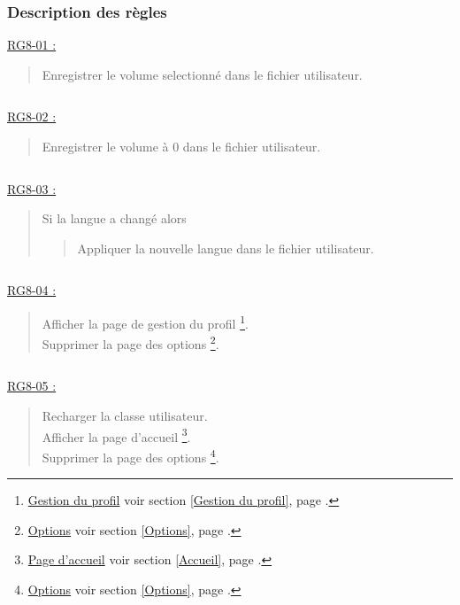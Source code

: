 \documentclass{report}
\begin{document}
		\subsubsection{Description des règles}

			\underline{RG8-01 :}
				\begin{quote}
					Enregistrer le volume selectionné dans le fichier utilisateur.
				\end{quote}

			$\,$	

			\underline{RG8-02 :}
				\begin{quote}
					Enregistrer le volume à 0 dans le fichier utilisateur.
				\end{quote}

			$\,$		

			\underline{RG8-03 :}
				\begin{quote}
					Si la langue a changé alors
					\begin{quote}
						Appliquer la nouvelle langue dans le fichier utilisateur.
					\end{quote}
				\end{quote}

			$\,$

			\underline{RG8-04 :}
				\begin{quote}
					Afficher la page de gestion du profil%
						\footnote[1]{
							\hyperlink{Gestion du profil}{Gestion du profil}
							\og voir section \ref{Gestion du profil}, page \pageref{Gestion du profil}.\fg
						}.\\
					Supprimer la page des options%
						\footnote[2]{
							\hyperlink{Options}{Options}
							\og voir section \ref{Options}, page \pageref{Options}.\fg
						}.						
				\end{quote}

			$\,$			
				
			\underline{RG8-05 :}
				\begin{quote}
					Recharger la classe utilisateur.\\
					Afficher la page d'accueil%
						\footnote[3]{
							\hyperlink{Page d'accueil}{Page d'accueil}
							\og voir section \ref{Accueil}, page \pageref{Accueil}.\fg
						}.\\
					Supprimer la page des options%
						\footnote[2]{
							\hyperlink{Options}{Options}
							\og voir section \ref{Options}, page \pageref{Options}.\fg
						}.		
				\end{quote}
				
\newpage
\end{document}
